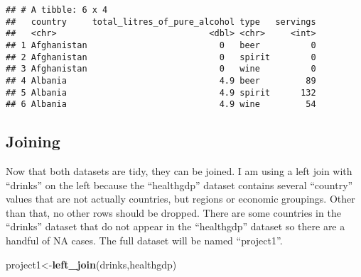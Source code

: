 \documentclass[]{article}
\newenvironment{Shaded}{\begin{snugshade}}{\end{snugshade}}
\newcommand{\KeywordTok}[1]{\textcolor[rgb]{0.13,0.29,0.53}{\textbf{#1}}}
\newcommand{\DataTypeTok}[1]{\textcolor[rgb]{0.13,0.29,0.53}{#1}}
\newcommand{\StringTok}[1]{\textcolor[rgb]{0.31,0.60,0.02}{#1}}
\newcommand{\OperatorTok}[1]{\textcolor[rgb]{0.81,0.36,0.00}{\textbf{#1}}}
\newcommand{\NormalTok}[1]{#1}
\begin{document}
\begin{Shaded}
\end{Shaded}

\begin{verbatim}
## # A tibble: 6 x 4
##   country     total_litres_of_pure_alcohol type   servings
##   <chr>                              <dbl> <chr>     <int>
## 1 Afghanistan                          0   beer          0
## 2 Afghanistan                          0   spirit        0
## 3 Afghanistan                          0   wine          0
## 4 Albania                              4.9 beer         89
## 5 Albania                              4.9 spirit      132
## 6 Albania                              4.9 wine         54
\end{verbatim}

\subsection{Joining}\label{joining}

Now that both datasets are tidy, they can be joined. I am using a left
join with ``drinks'' on the left because the ``healthgdp'' dataset
contains several ``country'' values that are not actually countries, but
regions or economic groupings. Other than that, no other rows should be
dropped. There are some countries in the ``drinks'' dataset that do not
appear in the ``healthgdp'' dataset so there are a handful of NA cases.
The full dataset will be named ``project1''.

\begin{Shaded}
\begin{Highlighting}[]
\NormalTok{project1<-}\KeywordTok{left_join}\NormalTok{(drinks,healthgdp)}
\end{Highlighting}
\end{Shaded}
\end{document}
